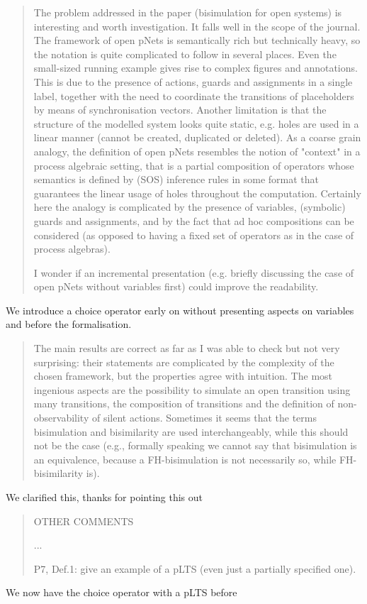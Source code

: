 \documentclass[10pt]{article}
\newenvironment{review}{\bgroup\itshape\begin{quote}}{\end{quote}\egroup}
\begin{document}
\begin{review}
The problem addressed in the paper (bisimulation for open systems) is interesting
and worth investigation. It falls well in the scope of the journal.
The framework of open pNets is semantically rich but technically heavy, so the notation is quite complicated to follow
in several places. Even the small-sized running example gives rise to complex figures and annotations.
This is due to the presence of actions, guards and assignments in a single label, together with the
need to coordinate the transitions of placeholders by means of synchronisation vectors.
Another limitation is that the structure of the modelled system looks quite static, e.g. holes are used
in a linear manner (cannot be created, duplicated or deleted).
As a coarse grain analogy, the definition of open pNets resembles the notion of "context" in a process
algebraic setting, that is a partial composition of operators whose semantics is defined by (SOS) inference
rules in some format that guarantees the linear usage of holes throughout the computation.
Certainly here the analogy is complicated by the presence of variables, (symbolic) guards and assignments,
and by the fact that ad hoc compositions can be considered (as opposed to having a fixed set of operators
as in the case of process algebras).

I wonder if an incremental presentation (e.g. briefly discussing the case of open pNets without variables first)
could improve the readability.
\end{review}
We introduce a choice operator early on without presenting aspects on variables and before the formalisation.

\begin{review}
The main results are correct as far as I was able to check but not very surprising: their statements are
complicated by the complexity of the chosen framework, but the properties agree with intuition.
The most ingenious aspects are the possibility to simulate an open transition using many transitions,
the composition of transitions and the definition of non-observability of silent actions.
Sometimes it seems that the terms bisimulation and bisimilarity are used interchangeably, while
this should not be the case (e.g., formally speaking we cannot say that bisimulation is an equivalence,
because a FH-bisimulation is not necessarily so, while FH-bisimilarity is).
\end{review}
We clarified this, thanks for pointing this out

\begin{review}
OTHER COMMENTS

...

P7, Def.1: give an example of a pLTS (even just a partially specified one).
\end{review}
We now have the choice operator with a pLTS before
\end{document}
